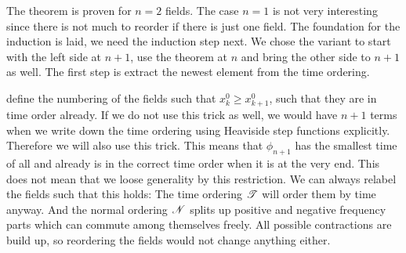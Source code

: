 \documentclass[11pt, english, fleqn, DIV=15, headinclude, BCOR=1cm]{scrartcl}
\begin{document}
The theorem is proven for $n = 2$ fields. The case $n = 1$ is not very
interesting since there is not much to reorder if there is just one field. The
foundation for the induction is laid, we need the induction step next. We chose
the variant to start with the left side at $n+1$, use the theorem at $n$ and
bring the other side to $n+1$ as well. The first step is extract the newest
element from the time ordering.

\textcite[90]{Peskin/QFT/1995} define the numbering of the fields such that
$x_k^0 \geq x_{k+1}^0$, such that they are in time order already. If we do not
use this trick as well, we would have $n+1$ terms when we write down the time
ordering using Heaviside step functions explicitly. Therefore we will also use
this trick. This means that $\phi_{n+1}$ has the smallest time of all and
already is in the correct time order when it is at the very end. This does not
mean that we loose generality by this restriction. We can always relabel the
fields such that this holds: The time ordering $\mathscr T$ will order them by
time anyway. And the normal ordering $\mathscr N$ splits up positive and
negative frequency parts which can commute among themselves freely. All
possible contractions are build up, so reordering the fields would not change
anything either.
\end{document}
